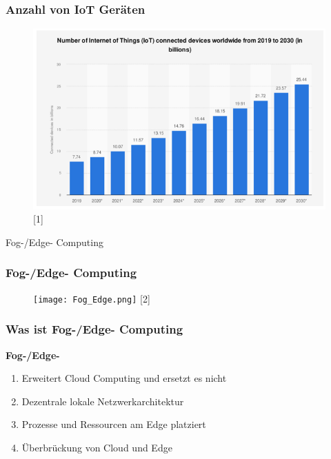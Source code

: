 \documentclass{beamer}
\begin{document}

\begin{frame}
	\frametitle{\textbf{Anzahl von IoT Geräten}}
	\begin{figure}
		\includegraphics[width=\textwidth]{Iot_Geräte.png}
		\hspace*{15pt}\hbox{\scriptsize [1]}
	\end{figure}
\end{frame}

\begin{frame}
	\begin{center}
		\Large Fog-/Edge- Computing
	\end{center}
\end{frame}

\begin{frame}
	\frametitle{\textbf{Fog-/Edge- Computing}}
	\begin{figure}
		\texttt{[image: Fog\_Edge.png]}
		\hspace*{15pt}\hbox{\scriptsize [2]}
	\end{figure}
\end{frame}


\begin{frame}
	\frametitle{\textbf{Was ist Fog-/Edge- Computing}}
	\begin{block}{\textbf{Fog-/Edge-}}
		\begin{enumerate}
			\item Erweitert Cloud Computing und ersetzt es nicht
			\item Dezentrale lokale Netzwerkarchitektur
			\item Prozesse und Ressourcen am Edge platziert
			\item Überbrückung von Cloud und Edge
		\end{enumerate}
	\end{block}
\end{frame}
\end{document}
